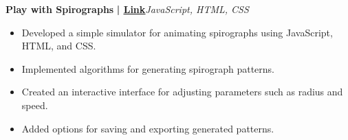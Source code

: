 \documentclass[a4paper]{article}
\begin{document}
          \vspace*{3mm}
      {\textbf{Play with Spirographs}}\textbf{ | \href{https://github.com/syedhuzaif199/play-with-spirographs}{\underline{Link}}}\hfill{\sl JavaScript, HTML, CSS}\\
          \vspace{-1mm}
\begin{itemize} \itemsep -3pt
\item Developed a simple simulator for animating spirographs using JavaScript, HTML, and CSS.
\item Implemented algorithms for generating spirograph patterns.
\item Created an interactive interface for adjusting parameters such as radius and speed.
\item Added options for saving and exporting generated patterns.
\end{itemize}
          \vspace*{3mm}

    \ 
    
\end{document}
